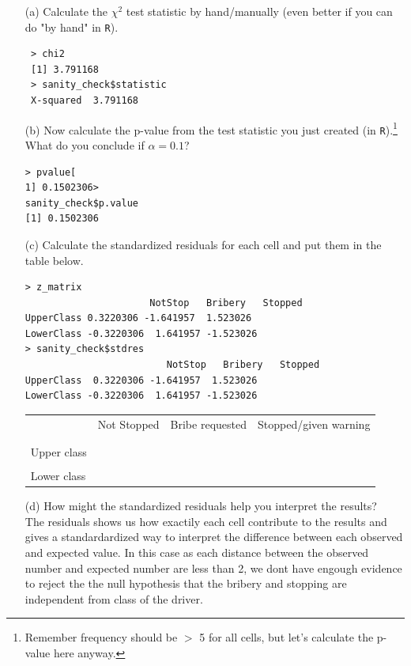 \documentclass[12pt,letterpaper]{article}
\begin{document}
\begin{enumerate}
	
	\item [(a)]
	Calculate the $\chi^2$ test statistic by hand/manually (even better if you can do "by hand" in \texttt{R}).\\
	  	
	\begin{verbatim}
 > chi2
 [1] 3.791168
 > sanity_check$statistic
 X-squared  3.791168 
	\end{verbatim}
	\vspace{7cm}
	
	\item [(b)]
	Now calculate the p-value from the test statistic you just created (in \texttt{R}).\footnote{Remember frequency should be $>$ 5 for all cells, but let's calculate the p-value here anyway.}  What do you conclude if $\alpha = 0.1$?\\
	  	
		\begin{verbatim}
> pvalue[
1] 0.1502306> 
sanity_check$p.value
[1] 0.1502306
	\end{verbatim}
	\newpage
	\item [(c)] Calculate the standardized residuals for each cell and put them in the table below.
	\vspace{1cm}
 
		\begin{verbatim}
> z_matrix              
                      NotStop   Bribery   Stopped
UpperClass 0.3220306 -1.641957  1.523026
LowerClass -0.3220306  1.641957 -1.523026
> sanity_check$stdres              
                         NotStop   Bribery   Stopped
UpperClass  0.3220306 -1.641957  1.523026
LowerClass -0.3220306  1.641957 -1.523026
\end{verbatim} 	
	\begin{table}[h]
		\centering
		\begin{tabular}{l | c c c }
			& Not Stopped & Bribe requested & Stopped/given warning \\
			\\[-1.8ex] 
			\hline \\[-1.8ex]
			Upper class  &  &  &  \\
			\\
			Lower class &  &   &   \\
			
		\end{tabular}
	\end{table}
	
	
	\vspace{7cm}
	\item [(d)] How might the standardized residuals help you interpret the results?  
\\The residuals shows us how exactily each cell contribute to the results and gives a standardardized way to interpret the difference between each observed and expected value. In this case as each distance between the observed number and expected number are less than 2, we dont have engough evidence to reject the  the null hypothesis that the bribery and stopping are independent from class of the driver. 
\end{enumerate}
\end{document}
